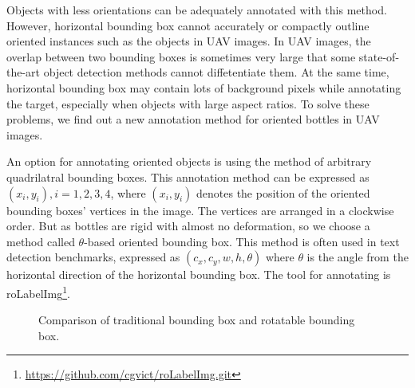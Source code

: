 Objects with less orientations can be adequately annotated with this method. However, horizontal bounding box cannot accurately or compactly outline oriented instances such as the objects in UAV images. In UAV images, the overlap between two bounding boxes is sometimes very large that some state-of-the-art object detection methods cannot diffetentiate them\cite{DOTA}. At the same time, horizontal bounding box may contain lots of background pixels while annotating the target, especially when objects with large aspect ratios. To solve these problems, we find out a new annotation method for oriented bottles in UAV images.

An option for annotating oriented objects is using the method of arbitrary quadrilatral bounding boxes. This annotation method can be expressed as ${(x_i, y_i), i=1,2,3,4}$, where $(x_i, y_i)$ denotes the position of the oriented bounding boxes' vertices in the image\cite{DOTA}. The vertices are arranged in a clockwise order. But as bottles are rigid with almost no deformation, so we choose a method called $\theta$-based oriented bounding box. This method is often used in text detection benchmarks, expressed as $(c_x, c_y, w, h, \theta)$ where $\theta$ is the angle from the horizontal direction of the horizontal bounding box\cite{DOTA}. The tool for annotating is roLabelImg\footnote{\url{https://github.com/cgvict/roLabelImg.git}}.

\begin{figure}
	\centering
	\caption{Comparison of traditional bounding box and rotatable bounding box. }
\end{figure}



